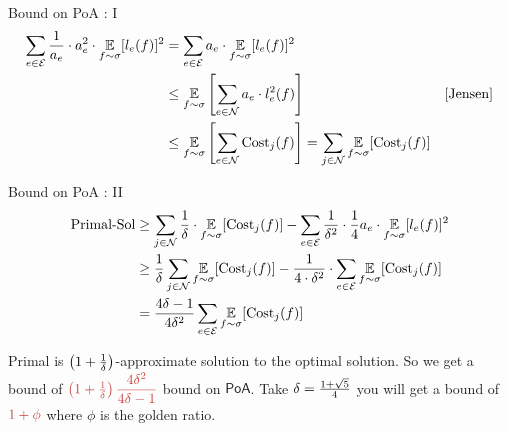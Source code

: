 \documentclass[aspectratio=1610]{beamer}
\begin{document}
\begin{frame}{Bound on \textsf{PoA} : I}
	\vspace*{-8mm}
	\begin{align*}
		\sum_{e\in \mathcal{E}} \frac1{ a_e}\cdot a_e^2\cdot \underset{f\sim \sigma}{\mathbb{E}}[l_e(f)]^2 & = \sum_{e\in \mathcal{E}}  a_e\cdot\underset{f\sim \sigma}{\mathbb{E}}[l_e(f)]^2                                                                                        \\
		                                                                                   & \leq \underset{f\sim \sigma}{\mathbb{E}}\left[ \sum_{e\in\mathcal{N}} a_e\cdot l_e^2(f)  \right]                                                           & [\text{Jensen}] \\
		                                                                                   & \leq \underset{f\sim \sigma}{\mathbb{E}}\left[ \sum_{e\in\mathcal{N}} \text{Cost}_j(f)\right] =\sum_{j\in\mathcal{N}}\underset{f\sim \sigma}{\mathbb{E}}[\text{Cost}_j(f)]
	\end{align*}
\end{frame}
\begin{frame}{Bound on \textsf{PoA} : II}
	\begin{align*}
		\text{Primal-Sol} & \geq \sum\limits_{j\in \mathcal{N}}\frac1{\delta}\cdot \underset{f\sim \sigma}{\mathbb{E}}[\text{Cost}_j(f)]-\sum_{e\in \mathcal{E}}\frac1{\delta^2}\cdot \frac1{4}a_e\cdot \underset{f\sim \sigma}{\mathbb{E}}[l_e(f)]^2 \\
		                  & \geq  \frac{1}{\delta}\sum_{j\in\mathcal{N}}\underset{f\sim \sigma}{\mathbb{E}}[\text{Cost}_j(f)]-\frac1{4\cdot \delta^2}\cdot \sum_{e\in \mathcal{E}}\underset{f\sim \sigma}{\mathbb{E}}[\text{Cost}_j(f)]               \\
		                  & = \frac{4\delta-1}{4\delta^2}\sum_{e\in \mathcal{E}}\underset{f\sim \sigma}{\mathbb{E}}[\text{Cost}_j(f)]
	\end{align*}\pause

	Primal is $\left(1+\frac1{\delta}\right)$-approximate solution to the optimal solution. So we get a bound of $\mathcolor{myr}{\lt(1+\frac1{\dl}\rt)\dfrac{4\dl^2}{4\dl-1}}$ bound on $\textsf{PoA}$.  Take $\delta=\frac{1+\sqrt{5}}{4}$ you will get a bound of $\mathcolor{myr}{1+\phi}$ where $\phi$ is the golden ratio.
\end{frame}
\end{document}
